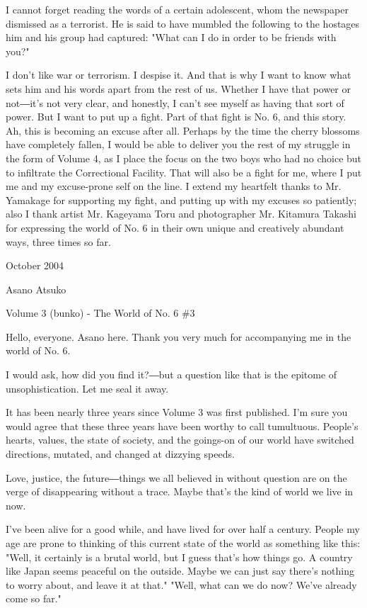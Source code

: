 I cannot forget reading the words of a certain adolescent, whom the
newspaper dismissed as a terrorist. He is said to have mumbled the
following to the hostages him and his group had captured: "What can I do
in order to be friends with you?"

I don't like war or terrorism. I despise it. And that is why I want to
know what sets him and his words apart from the rest of us. Whether I
have that power or not―it's not very clear, and honestly, I can't see
myself as having that sort of power. But I want to put up a fight. Part
of that fight is No. 6, and this story. Ah, this is becoming an excuse
after all. Perhaps by the time the cherry blossoms have completely
fallen, I would be able to deliver you the rest of my struggle in the
form of Volume 4, as I place the focus on the two boys who had no choice
but to infiltrate the Correctional Facility. That will also be a fight
for me, where I put me and my excuse-prone self on the line. I extend my
heartfelt thanks to Mr. Yamakage for supporting my fight, and putting up
with my excuses so patiently; also I thank artist Mr. Kageyama Toru and
photographer Mr. Kitamura Takashi for expressing the world of No. 6 in
their own unique and creatively abundant ways, three times so far.

October 2004

Asano Atsuko

Volume 3 (bunko) - The World of No. 6 \#3

Hello, everyone. Asano here. Thank you very much for accompanying me in
the world of No. 6.

I would ask, how did you find it?―but a question like that is the
epitome of unsophistication. Let me seal it away.

It has been nearly three years since Volume 3 was first published. I'm
sure you would agree that these three years have been worthy to call
tumultuous. People's hearts, values, the state of society, and the
goings-on of our world have switched directions, mutated, and changed at
dizzying speeds.

Love, justice, the future―things we all believed in without question are
on the verge of disappearing without a trace. Maybe that's the kind of
world we live in now.

I've been alive for a good while, and have lived for over half a
century. People my age are prone to thinking of this current state of
the world as something like this: "Well, it certainly is a brutal world,
but I guess that's how things go. A country like Japan seems peaceful on
the outside. Maybe we can just say there's nothing to worry about, and
leave it at that." "Well, what can we do now? We've already come so
far."

